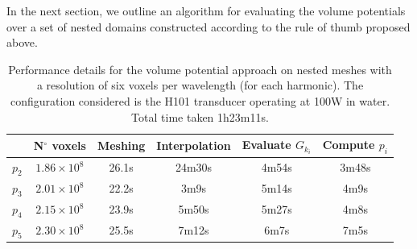 \documentclass[preprint]{JASA}
\begin{document}
In the next section, we outline an algorithm for evaluating the volume potentials 
over a set of nested domains constructed according to the rule of thumb proposed above.


\begin{table}[ht!]
    \centering
    \begin{tabular}{c  c  c  c  c c}
        \hline\hline
           &  N$^\circ$ voxels & Meshing & Interpolation & Evaluate $G_{k_i}$ & Compute $p_i$\\
        \hline
        $p_2$ & $1.86\times10^8$ & 26.1s & 24m30s & 4m54s & 3m48s \\
        $p_3$ & $2.01\times10^8$ & 22.2s & 3m9s & 5m14s & 4m9s\\
        $p_4$ & $2.15\times10^8$ & 23.9s & 5m50s & 5m27s   & 4m8s   \\
        $p_5$ & $2.30\times10^8$ & 25.5s & 7m12s & 6m7s   & 7m5s \\
        \hline\hline
    \end{tabular}
    \caption{Performance details for the volume potential approach on nested 
    meshes with a resolution of six voxels per wavelength (for each harmonic). 
    The configuration considered is the H101 transducer operating at 100W in water.
    Total time taken 1h23m11s.}
    \label{tab:performance}
\end{table}

\end{document}
